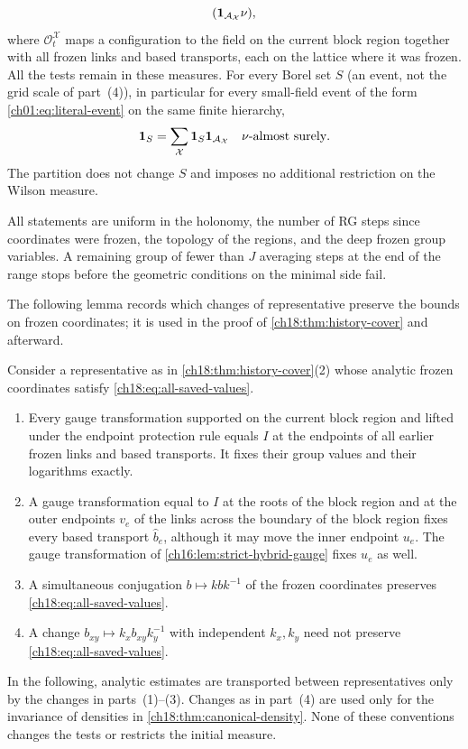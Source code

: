 \begin{theorem}
\begin{enumerate}
\[                    (\mathbf 1_{\mathcal A_{\mathcal X}}\nu),
\]
where $\mathscr O_t^{\mathcal X}$ maps a configuration to the field on the current block region together with all frozen links and based transports, each on the lattice where it was frozen. All the tests remain in these measures. For every Borel set $S$ (an event, not the grid scale of part~(4)), in particular for every small-field event of the form \eqref{ch01:eq:literal-event} on the same finite hierarchy,
\[
 \mathbf 1_S=\sum_{\mathcal X}
                \mathbf 1_S\mathbf 1_{\mathcal A_{\mathcal X}}
 \quad\nu\text{-almost surely}.
\]
The partition does not change $S$ and imposes no additional restriction on the Wilson measure.
\end{enumerate}
All statements are uniform in the holonomy, the number of RG steps since coordinates were frozen, the topology of the regions, and the deep frozen group variables. A remaining group of fewer than $J$ averaging steps at the end of the range stops before the geometric conditions on the minimal side fail.
\end{theorem}

The following lemma records which changes of representative preserve the bounds on frozen coordinates; it is used in the proof of \cref{ch18:thm:history-cover} and afterward.

\begin{lemma}\label{ch18:lem:frozen-preserving}
Consider a representative as in \cref{ch18:thm:history-cover}(2) whose analytic frozen coordinates satisfy \eqref{ch18:eq:all-saved-values}.
\begin{enumerate}
\item Every gauge transformation supported on the current block region and lifted under the endpoint protection rule equals $I$ at the endpoints of all earlier frozen links and based transports. It fixes their group values and their logarithms exactly.
\item A gauge transformation equal to $I$ at the roots of the block region and at the outer endpoints $v_e$ of the links across the boundary of the block region fixes every based transport $\widehat b_e$, although it may move the inner endpoint $u_e$. The gauge transformation of \cref{ch16:lem:strict-hybrid-gauge} fixes $u_e$ as well.
\item A simultaneous conjugation $b\mapsto kbk^{-1}$ of the frozen coordinates preserves \eqref{ch18:eq:all-saved-values}.
\item A change $b_{xy}\mapsto k_xb_{xy}k_y^{-1}$ with independent $k_x,k_y$ need not preserve \eqref{ch18:eq:all-saved-values}.
\end{enumerate}
In the following, analytic estimates are transported between representatives only by the changes in parts~(1)--(3). Changes as in part~(4) are used only for the invariance of densities in \cref{ch18:thm:canonical-density}. None of these conventions changes the tests or restricts the initial measure.
\end{lemma}


